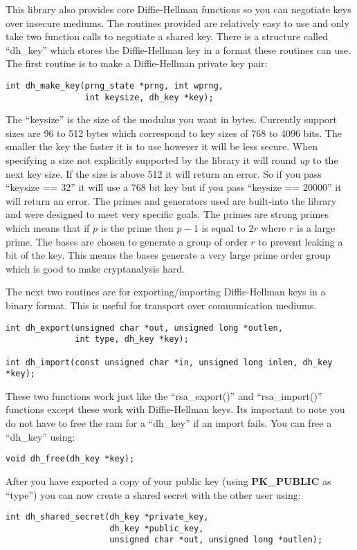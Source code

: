 \documentclass{book}
\begin{document}
This library also provides core Diffie-Hellman functions so you can negotiate keys over insecure mediums.  The routines 
provided are relatively easy to use and only take two function calls to negotiate a shared key.  There is a structure
called ``dh\_key'' which stores the Diffie-Hellman key in a format these routines can use.  The first routine is to
make a Diffie-Hellman private key pair:
\begin{verbatim}
int dh_make_key(prng_state *prng, int wprng, 
                int keysize, dh_key *key);
\end{verbatim}
The ``keysize'' is the size of the modulus you want in bytes.  Currently support sizes are 96 to 512 bytes which correspond 
to key sizes of 768 to 4096 bits. The smaller the key the faster it is to use however it will be less secure.  When 
specifying a size not explicitly supported by the library it will round {\em up} to the next key size.  If the size is 
above 512 it will return an error.  So if you pass ``keysize == 32'' it will use a 768 bit key but if you pass 
``keysize == 20000'' it will return an error.  The primes and generators used are built-into the library and were designed 
to meet very specific goals.  The primes are strong primes which means that if $p$ is the prime then
$p-1$ is equal to $2r$ where $r$ is a large prime.  The bases are chosen to generate a group of order $r$ to prevent
leaking a bit of the key.  This means the bases generate a very large prime order group which is good to make cryptanalysis
hard.

The next two routines are for exporting/importing Diffie-Hellman keys in a binary format.  This is useful for transport
over communication mediums.  

 
\begin{verbatim}
int dh_export(unsigned char *out, unsigned long *outlen, 
              int type, dh_key *key);

int dh_import(const unsigned char *in, unsigned long inlen, dh_key *key);
\end{verbatim}

These two functions work just like the ``rsa\_export()'' and ``rsa\_import()'' functions except these work with 
Diffie-Hellman keys. Its important to note you do not have to free the ram for a ``dh\_key'' if an import fails.  You can free a 
``dh\_key'' using:
\begin{verbatim}
void dh_free(dh_key *key);
\end{verbatim}
After you have exported a copy of your public key (using {\bf PK\_PUBLIC} as ``type'') you can now create a shared secret 
with the other user using:
\begin{verbatim}
int dh_shared_secret(dh_key *private_key, 
                     dh_key *public_key, 
                     unsigned char *out, unsigned long *outlen);
\end{verbatim}
\end{document}
